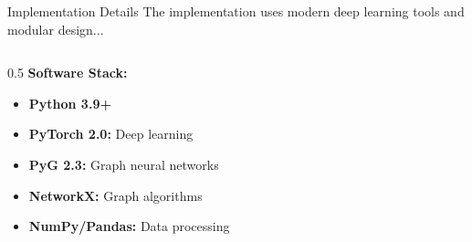 \documentclass[aspectratio=169]{beamer}
\begin{document}
\begin{frame}{Implementation Details}
    \vspace{-0.2cm}
    \small \textcolor{iiitblue}{The implementation uses modern deep learning tools and modular design...}
    
    \begin{columns}
        \begin{column}{0.5\textwidth}
            \textbf{Software Stack:}
            \begin{itemize}
                \item \textbf{Python 3.9+}
                \item \textbf{PyTorch 2.0:} Deep learning
                \item \textbf{PyG 2.3:} Graph neural networks
                \item \textbf{NetworkX:} Graph algorithms
                \item \textbf{NumPy/Pandas:} Data processing
            \end{itemize}
            
            \vspace{0.3cm}
            

\end{column}
\end{columns}
\end{frame}
\end{document}
